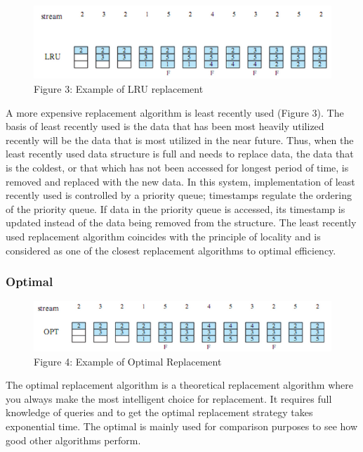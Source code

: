 \documentclass[12pt]{article}
\begin{document}
\begin{figure}[h]
\centering
\includegraphics[width=\columnwidth]{LRU}
\caption{Figure 3: Example of LRU replacement \cite{10}}
\end{figure}

A more expensive replacement algorithm is least recently used (Figure 3). The basis of least recently used is the data that has been most heavily utilized recently will be the data that is most utilized in the near future. Thus, when the least recently used data structure is full and needs to replace data, the data that is the coldest, or that which has not been accessed for longest period of time, is removed and replaced with the new data. In this system, implementation of least recently used is controlled by a priority queue; timestamps regulate the ordering of the priority queue. If data in the priority queue is accessed, its timestamp is updated instead of the data being removed from the structure. The least recently used replacement algorithm coincides with the principle of locality and is considered as one of the closest replacement algorithms to optimal efficiency.

\subsubsection{Optimal}
   
\begin{figure}[h]
\centering
\includegraphics[width=\columnwidth]{Optimal}
\caption{Figure 4: Example of Optimal Replacement \cite{10}}
\end{figure}

The optimal replacement algorithm is a theoretical replacement algorithm where you always make the most intelligent choice for replacement. It requires full knowledge of queries and to get the optimal replacement strategy takes exponential time. The optimal is mainly used for comparison purposes to see how good other algorithms perform.
\end{document}
